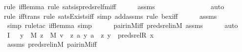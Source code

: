\begin{isabellebody}
{\isacharparenleft}{\kern0pt}rule\ iff{\isacharunderscore}{\kern0pt}lemma{\isacharcomma}{\kern0pt}\ rule\ sats{\isacharunderscore}{\kern0pt}is{\isacharunderscore}{\kern0pt}preds{\isacharunderscore}{\kern0pt}rel{\isacharunderscore}{\kern0pt}fm{\isacharunderscore}{\kern0pt}iff{\isacharparenright}{\kern0pt}\isanewline
\ \ \ \ \isamarkupfalse%
\ assms\ \isanewline
\ \ \ \ \ \ \ \ \ \ \ \ \ \isamarkupfalse%
\ auto{\isacharbrackleft}{\kern0pt}{}{\isacharbrackright}{\kern0pt}\isanewline
\ \ \ \ \isamarkupfalse%
{\isacharparenleft}{\kern0pt}rule\ iff{\isacharunderscore}{\kern0pt}trans{\isacharcomma}{\kern0pt}\ rule\ sats{\isacharunderscore}{\kern0pt}Exists{\isacharunderscore}{\kern0pt}iff{\isacharcomma}{\kern0pt}\ simp\ add{\isacharcolon}{\kern0pt}assms{\isacharcomma}{\kern0pt}\ rule\ bex{\isacharunderscore}{\kern0pt}iff{\isacharparenright}{\kern0pt}{\isacharplus}{\kern0pt}\isanewline
\ \ \ \ \isamarkupfalse%
\ assms\ \isanewline
\ \ \ \ \isamarkupfalse%
\ {\isacharparenleft}{\kern0pt}simp{\isacharcomma}{\kern0pt}\ rule{\isacharunderscore}{\kern0pt}tac\ iff{\isacharunderscore}{\kern0pt}lemma{\isacharcomma}{\kern0pt}\ simp{\isacharparenright}{\kern0pt}{\isacharplus}{\kern0pt}\isanewline
\ \ \ \ \isamarkupfalse%
\ pair{\isacharunderscore}{\kern0pt}in{\isacharunderscore}{\kern0pt}M{\isacharunderscore}{\kern0pt}iff\ preds{\isacharunderscore}{\kern0pt}rel{\isacharunderscore}{\kern0pt}in{\isacharunderscore}{\kern0pt}M\ assms\isanewline
\ \ \ \ \isamarkupfalse%
\ auto\isanewline
\ \ \isamarkupfalse%
\ I{}\ {\isacharcolon}{\kern0pt}\ {\isachardoublequoteopen}{\isachardot}{\kern0pt}{\isachardot}{\kern0pt}{\isachardot}{\kern0pt}\ {\isasymlongleftrightarrow}{\isacharparenleft}{\kern0pt}{\isasymexists}y\ {\isasymin}\ M{\isachardot}{\kern0pt}\ {\isasymexists}z\ {\isasymin}\ M{\isachardot}{\kern0pt}\ v\ {\isacharequal}{\kern0pt}\ {\isacharless}{\kern0pt}{\isacharless}{\kern0pt}z{\isacharcomma}{\kern0pt}\ a{\isachargreater}{\kern0pt}{\isacharcomma}{\kern0pt}\ {\isacharless}{\kern0pt}y{\isacharcomma}{\kern0pt}\ a{\isachargreater}{\kern0pt}{\isachargreater}{\kern0pt}\ {\isasymand}\ {\isacharless}{\kern0pt}z{\isacharcomma}{\kern0pt}\ y{\isachargreater}{\kern0pt}\ {\isasymin}\ preds{\isacharunderscore}{\kern0pt}rel{\isacharparenleft}{\kern0pt}R{\isacharcomma}{\kern0pt}\ x{\isacharparenright}{\kern0pt}{\isacharparenright}{\kern0pt}{\isachardoublequoteclose}\ \isanewline
\ \ \ \ \isamarkupfalse%
\ assms\ preds{\isacharunderscore}{\kern0pt}rel{\isacharunderscore}{\kern0pt}in{\isacharunderscore}{\kern0pt}M\ pair{\isacharunderscore}{\kern0pt}in{\isacharunderscore}{\kern0pt}M{\isacharunderscore}{\kern0pt}iff\ \isamarkupfalse%

\end{isabellebody}
